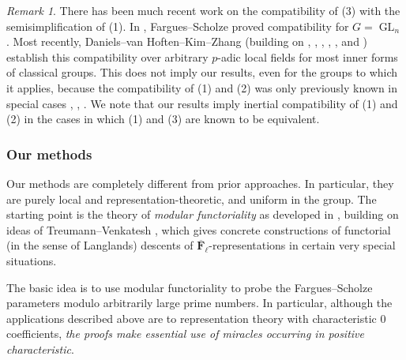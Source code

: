 \documentclass[reqno]{amsart}
\numberwithin{equation}{subsection}
\newcommand{\F}{\mathbf{F}}
\newcommand{\ol}[1]{\overline{#1}}
\newcommand{\ld}{{}^L}
\DeclareMathOperator{\GL}{GL}
\DeclareMathOperator{\Aut}{Aut}
\theoremstyle{remark}
\newtheorem{remark}[thm]{Remark}
\numberwithin{equation}{subsection}
\numberwithin{figure}{subsection}
\begin{document}
\begin{remark}
There has been much recent work on the compatibility of (3) with the semisimplification of (1). In \cite[Theorem I.9.6(ix)]{FS}, Fargues--Scholze proved compatibility for $G = \GL_n$. Most recently, Daniels--van Hoften--Kim--Zhang \cite[Theorem II]{DvHKZ26} (building on \cite{FS}, \cite{HKW22}, \cite{BMHN24}, \cite{Ham25}, \cite{Han26}, and \cite{Pen26}) establish this compatibility over arbitrary $p$-adic local fields for most inner forms of classical groups. This does not imply our results, even for the groups to which it applies, because the compatibility of (1) and (2) was only previously known in special cases \cite{OT21}, \cite{Tok23}, \cite{Oi26}. We note that our results imply inertial compatibility of (1) and (2) in the cases in which (1) and (3) are known to be equivalent.
\end{remark}

\subsubsection{Our methods}\label{ssec:II-intro-methods} 
Our methods are completely different from prior approaches. In particular, they are purely local and representation-theoretic, and uniform in the group. The starting point is the theory of \emph{modular functoriality} as developed in \cite{F24}, building on ideas of Treumann--Venkatesh \cite{TV}, which gives concrete constructions of functorial (in the sense of Langlands) descents of $\ol\F_\ell$-representations in certain very special situations.

The basic idea is to use modular functoriality to probe the Fargues--Scholze parameters modulo arbitrarily large prime numbers. In particular, although the applications described above are to representation theory with characteristic $0$ coefficients, \emph{the proofs make essential use of miracles occurring in positive characteristic}.
\end{document}
